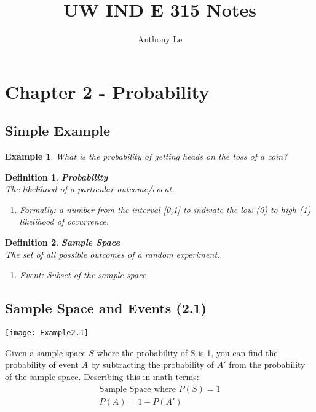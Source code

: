 \documentclass[../IND E 315.tex]{subfiles}
\title{UW IND E 315 Notes}
\author{Anthony Le}
\newtheorem{exmp}{Example}
\newtheorem{defn}{Definition}
\begin{document}
\pagestyle{fancy}
\fancyhead{}

\section*{Chapter 2 - Probability}
\subsection*{Simple Example}
\begin{exmp}
    What is the probability of getting heads on the toss of a coin?
\end{exmp}
\begin{defn}
    \textbf{Probability} \\
    The likelihood of a particular outcome/event.
    \begin{enumerate}
        \item Formally: a number from the interval [0,1] to indivate the low (0) to high (1) likelihood of occurrence.
    \end{enumerate}
\end{defn}

\begin{defn}
    \textbf{Sample Space} \\
    The set of all possible outcomes of a random experiment.
    \begin{enumerate}
        \item Event: Subset of the sample space
    \end{enumerate}
\end{defn}

\subsection*{Sample Space and Events (2.1)}
    \begin{center}
        \texttt{[image: Example2.1]}
    \end{center}
Given a sample space $S$ where the probability of S is 1, you can find the probability of event $A$ by subtracting the probability of $A'$ from the probability of the sample space. Describing this in math terms:
\begin{equation*}
    \begin{aligned}
        \text{Sample Space where } P(S) = 1 \\
        P(A) = 1- P(A')
    \end{aligned}
\end{equation*}
\end{document}
